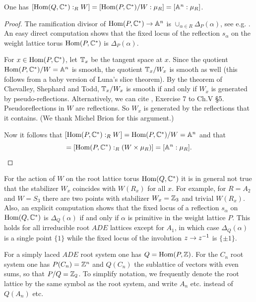 \documentclass[table,x11names]{amsart}
\begin{document}
 \begin{lemma}\label{lem:R-quotient}
   One has $[\operatorname{Hom}(Q,{\mathbb C}^*):_R W] = [\operatorname{Hom}(P,{\mathbb C}^*)/W : \mu_R] = [{\mathbb A}^n:\mu_R]$.
 \end{lemma}
 \begin{proof}
   The ramification divisor of $\operatorname{Hom}(P,{\mathbb C}^*) \to {\mathbb A}^n$ is
   $\cup_{\alpha\in R}\Delta_P(\alpha)$, see
   e.g. \cite[6.4, 6.8]{steinberg1965regular-elements}.
   An easy direct computation shows
   that the fixed locus of the reflection $s_\alpha$ on the weight lattice
   torus $\operatorname{Hom}(P,{\mathbb C}^*)$ is
   $\Delta_P(\alpha)$. 

   For $x\in \operatorname{Hom}(P,{\mathbb C}^*)$, let ${\mathbb T}_x$ be the tangent space at $x$.
   Since the quotient $\operatorname{Hom}(P,{\mathbb C}^*)/W={\mathbb A}^n$ is smooth, the quotient
   ${\mathbb T}_x/W_x$ is smooth as well (this follows from a baby version of
   Luna's slice theorem).  By the theorem of Chevalley, Shephard and
   Todd,
   ${\mathbb T}_x/W_x$ is smooth if and only if $W_x$ is generated by
   pseudo-reflections.
   Alternatively, we can cite \cite{bourbaki2002lie-groups}, Exercise
   7 to Ch.V \S5.
   Pseudoreflections in $W$ are reflections. So $W_x$ is
   generated by the reflections that it contains.  (We thank Michel
   Brion for this argument.)

   Now it follows that $[\operatorname{Hom}(P, {\mathbb C}^*) :_R W] = \operatorname{Hom}(P, {\mathbb C}^*)/ W =
   {\mathbb A}^n$ and that 
   \begin{displaymath}
     [\Hom(Q, \bC^*) :_R W ] = 
     [\Hom(P, \bC^*) :_R (W \times \mu_R) ] =
     [\bA^n : \mu_R]. 
   \end{displaymath}
 \end{proof}

 \begin{remark}
   For the action of $W$ on the root lattice torus $\operatorname{Hom}(Q,{\mathbb C}^*)$ it is in general not true that
   the stabilizer $W_x$ coincides with $W(R_x)$ for all $x$. For
   example, for 
   $R=A_2$ and $W=S_3$ there are two points with stabilizer
   $W_x={\mathbb Z}_3$ and trivial $W(R_x)$.
   Also, an explicit computation shows that the fixed locus of a reflection
   $s_\alpha$ on $\operatorname{Hom}(Q,{\mathbb C}^*)$ is $\Delta_Q(\alpha)$ if and only if $\alpha$ is
   primitive in the weight lattice $P$. This holds for all irreducible
   root $ADE$ lattices except for $A_1$, in which case
   $\Delta_Q(\alpha)$ is a single point $\{1\}$ while the fixed
   locus of the involution $z\to z^{-1}$ is $\{\pm1\}$.
 \end{remark}

 For a simply laced $ADE$ root system one has $Q=\operatorname{Hom}(P,{\mathbb Z})$. For the
 $C_n$ root system one has $P(C_n)={\mathbb Z}^n$ and $Q(C_n)$ the sublattice
 of vectors with even sums, so that $P/Q={\mathbb Z}_2$. To simplify notation,
 we frequently denote the root lattice by the same symbol as the root
 system, and write $A_n$ etc. instead of $Q(A_n)$ etc.
 
\end{document}
